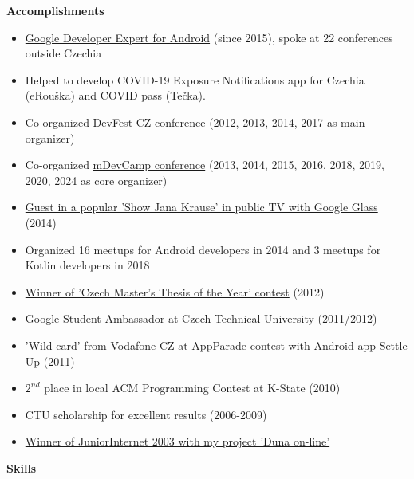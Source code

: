 \documentclass[letterpaper,11pt]{article}
\newcommand{\resheading}[1]{{\large \colorbox{mygrey}{\begin{minipage}{\textwidth}{\textbf{#1 \vphantom{p\^{E}}}}\end{minipage}}}}
\begin{document}
	
\resheading{Accomplishments}
\begin{itemize}
	\item
	\href{https://developers.google.com/experts/}{Google Developer Expert for Android} (since 2015), spoke at 22 conferences outside Czechia
	\item Helped to develop COVID-19 Exposure Notifications app for Czechia (eRouška) and COVID pass (Tečka).
	\item{Co-organized \href{http://www.devfest.cz/}{DevFest CZ conference} (2012, 2013, 2014, 2017 as main organizer)}
	\item{Co-organized \href{http://www.mdevcamp.eu/}{mDevCamp conference} (2013, 2014, 2015, 2016, 2018, 2019, 2020, 2024 as core organizer)}
	\item
	\href{https://www.youtube.com/watch?v=6z3ScqblqFk}{Guest in a popular 'Show Jana Krause' in public TV with Google Glass} (2014)
	\item Organized 16 meetups for Android developers in 2014 and 3 meetups for Kotlin developers in 2018
	\item \href{http://www.diplomovaprace.cz/}{Winner of 'Czech Master's Thesis of the Year' contest} (2012)
	\item  \href{http://www.google.com/intl/en/jobs/students/proscho/programs/emea/ambassador/}{Google Student Ambassador} at Czech Technical University (2011/2012)
	\item 'Wild card' from Vodafone CZ at \href{http://www.mediar.cz/treti-prehlidku-appparade-ovladly-aplikace-pro-android-zvitezil-night-walker-tomase-zveriny/}{AppParade} contest with Android app \href{https://market.android.com/details?id=cz.destil.settleup}{Settle Up} (2011)
	\item $2^{nd}$ place in local ACM Programming Contest at K-State (2010) 
	\item CTU scholarship for excellent results (2006-2009)
	\item \href{http://www.juniorinternet.cz/winners/307/david-vavra.aspx}{Winner of JuniorInternet 2003 with my project 'Duna on-line'}
\end{itemize}	
	
\resheading{Skills}
\end{document}

